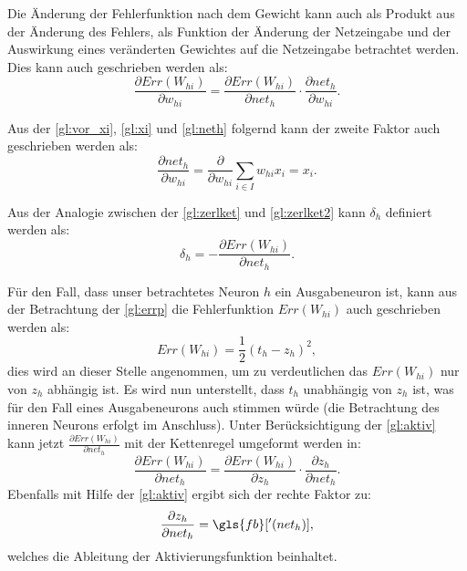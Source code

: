 Die Änderung der Fehlerfunktion nach dem Gewicht kann auch als Produkt aus der Änderung des Fehlers, als Funktion der Änderung der Netzeingabe und der Auswirkung eines veränderten Gewichtes auf die Netzeingabe betrachtet werden. Dies kann auch geschrieben werden als:
\begin{equation}
\frac{\partial Err(W_{hi})}{\partial w_{hi}} = \frac{\partial Err(W_{hi})}{\partial net_{h}} \cdot \frac{\partial net_{h}}{\partial w_{hi}}.
\label{gl:zerlket2}
\end{equation}

Aus der \autoref{gl:vor_xi}, \autoref{gl:xi} und \autoref{gl:neth} folgernd kann der zweite Faktor auch geschrieben werden als:
\begin{equation}
\frac{\partial net_{h}}{\partial w_{hi}} = \frac{\partial }{\partial w_{hi}} \sum\limits_{i \in I} w_{hi} x_{i} = x_{i} .
\label{gl:ok_bak}
\end{equation}

Aus der Analogie zwischen der \autoref{gl:zerlket} und \autoref{gl:zerlket2} kann $\delta_{h}$ definiert werden als:
\begin{equation}
\delta_{h}= -\frac{\partial Err(W_{hi})}{\partial net_{h}}  .
\label{gl:deltah_bak}
\end{equation}

Für den Fall, dass unser betrachtetes Neuron $h$ ein Ausgabeneuron ist, kann aus der Betrachtung der \autoref{gl:errp} die Fehlerfunktion $Err(W_{hi})$ auch geschrieben werden als:
\begin{equation}
Err(W_{hi})= \frac{1}{2} (t_{h}-z_{h})^2 ,
\label{gl:fehler_bak}
\end{equation}
dies wird an dieser Stelle angenommen, um zu verdeutlichen das $Err(W_{hi})$ nur von $z_{h}$ abhängig ist. Es wird nun unterstellt, dass $t_h$ unabhängig von $z_h$ ist, was für den Fall eines Ausgabeneurons auch stimmen würde (die Betrachtung des inneren Neurons erfolgt im Anschluss). Unter Berücksichtigung der \autoref{gl:aktiv} kann jetzt $\frac{\partial Err(W_{hi})}{\partial net_{h}}$ mit der Kettenregel umgeformt werden in:
\begin{equation}
\frac{\partial Err(W_{hi})}{\partial net_{h}} = \frac{\partial Err(W_{hi})}{\partial z_{h}} \cdot \frac{\partial z_{h}}{\partial net_{h}}.
\label{gl:ohket_bak}
\end{equation}
Ebenfalls mit Hilfe der \autoref{gl:aktiv} ergibt sich der rechte Faktor zu:
\begin{equation}
\frac{\partial z_{h}}{\partial net_{h}} = \gls{fb}['(net_h)],
\label{gl:aktiv_neth_bak}
\end{equation}
welches die Ableitung der Aktivierungsfunktion beinhaltet.

